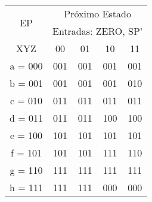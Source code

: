 %
%
%

\begin{table}[H]
  \centering
  \begin{tabular}{c c c c c}
    \toprule
    \multirow{2}{*}{EP}  & \multicolumn{4}{c}{Próximo Estado} \\
    & \multicolumn{4}{c}{Entradas: ZERO, SP'} \\  \cmidrule{2-5}
    XYZ     & 00  & 01  & 10  & 11  \\ \toprule
    a = 000 & 001 & 001 & 001 & 001 \\ \midrule
    b = 001 & 001 & 001 & 001 & 010 \\ \midrule
    c = 010 & 011 & 011 & 011 & 011 \\ \midrule
    d = 011 & 011 & 011 & 100 & 100 \\ \midrule
    e = 100 & 101 & 101 & 101 & 101 \\ \midrule
    f = 101 & 101 & 101 & 111 & 110 \\ \midrule
    g = 110 & 111 & 111 & 111 & 111 \\ \midrule
    h = 111 & 111 & 111 & 000 & 000 \\ \bottomrule
  \end{tabular}
\end{table}
